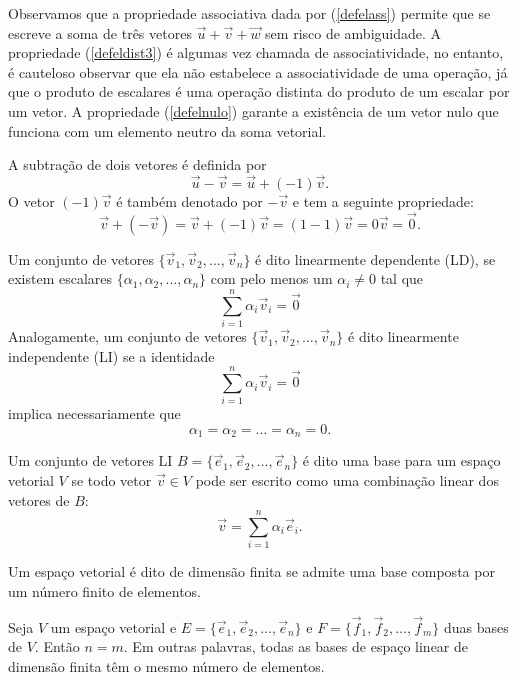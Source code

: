 \begin{obs}Observamos que a propriedade associativa dada por (\ref{defelass}) permite que se escreve a soma de três vetores $\vec{u}+\vec{v}+\vec{w}$ sem risco de ambiguidade. A propriedade (\ref{defeldist3}) é algumas vez chamada de associatividade, no entanto, é cauteloso observar que ela não estabelece a associatividade de uma operação, já que o produto de escalares é uma operação distinta do produto de um escalar por um vetor. A propriedade (\ref{defelnulo}) garante a existência de um vetor nulo que funciona com um elemento neutro da soma vetorial. \end{obs}

A subtração de dois vetores é definida por
\begin{equation}\label{delsub}
\vec{u}-\vec{v}=\vec{u}+ (-1) \vec{v}.
\end{equation}
O vetor $(-1) \vec{v}$ é também denotado por $-\vec{v}$ e tem a seguinte propriedade:
\begin{equation}\label{delinvad}
\vec{v}+(-\vec{v})=\vec{v}+(-1) \vec{v} = (1-1)\vec{v}=0\vec{v}=\vec{0}.
\end{equation}

Um conjunto de vetores $\{\vec{v}_1, \vec{v}_2,\ldots, \vec{v}_n\}$ é dito linearmente dependente (LD), se existem escalares $\{\alpha_1,\alpha_2,\ldots, \alpha_n\}$ com pelo menos um $\alpha_i\neq 0$ tal que
$$\sum_{i=1}^n\alpha_i \vec{v}_i=\vec{0}$$
Analogamente, um conjunto de vetores $\{\vec{v}_1, \vec{v}_2,\ldots, \vec{v}_n\}$ é dito linearmente independente (LI) se a identidade
$$\sum_{i=1}^n\alpha_i \vec{v}_i=\vec{0}$$
implica necessariamente que
$$\alpha_1=\alpha_2=\ldots=\alpha_n=0.$$

Um conjunto de vetores LI $B=\{\vec{e}_1, \vec{e}_2,\ldots, \vec{e}_n\}$ é dito uma base para um espaço vetorial $V$ se todo vetor $\vec{v}\in V$ pode ser escrito como uma combinação linear dos vetores de $B$:
$$\vec{v}=\sum_{i=1}^n \alpha_i \vec{e}_i.$$

Um espaço vetorial é dito de dimensão finita se admite uma base composta por um número finito de elementos.

\begin{teo}\label{teo_dim} Seja $V$ um espaço vetorial e $E=\{\vec{e}_1, \vec{e}_2,\ldots, \vec{e}_n\}$ e $F=\{\vec{f}_1, \vec{f}_2,\ldots, \vec{f}_m\}$ duas bases de $V$. Então $n=m$. Em outras palavras, todas as bases de espaço linear de dimensão finita têm o mesmo número de elementos.
 \end{teo}

